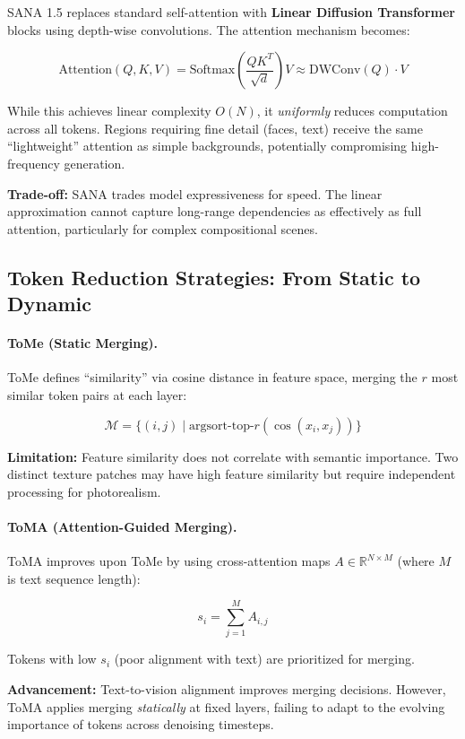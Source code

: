 \documentclass{article}
\begin{document}
SANA 1.5 \cite{xie2025sana} replaces standard self-attention with
\textbf{Linear Diffusion Transformer} blocks using depth-wise convolutions.
The attention mechanism becomes:

$$\text{Attention}(Q, K, V) = \text{Softmax}\left(\frac{QK^T}{\sqrt{d}}\right)V
    \approx \text{DWConv}(Q) \cdot V$$

While this achieves linear complexity $O(N)$, it \textit{uniformly} reduces
computation across all tokens. Regions requiring fine detail (faces, text)
receive the same ``lightweight'' attention as simple backgrounds, potentially
compromising high-frequency generation.

\textbf{Trade-off:} SANA trades model expressiveness for speed. The linear
approximation cannot capture long-range dependencies as effectively as full
attention, particularly for complex compositional scenes.

\subsection{Token Reduction Strategies: From Static to Dynamic}

\paragraph{ToMe (Static Merging).}
ToMe \cite{bolya2023token} defines ``similarity'' via cosine distance in feature
space, merging the $r$ most similar token pairs at each layer:

$$
    \mathcal{M} = \{(i, j) \mid \text{argsort-top-}r(\cos(x_i, x_j))\}
$$

\textbf{Limitation:} Feature similarity does not correlate with semantic
importance. Two distinct texture patches may have high feature similarity
but require independent processing for photorealism.

\paragraph{ToMA (Attention-Guided Merging).}
ToMA \cite{lu2025toma} improves upon ToMe by using cross-attention maps
$A \in \mathbb{R}^{N \times M}$ (where $M$ is text sequence length):

$$
    s_i = \sum_{j=1}^{M} A_{i,j}
$$

Tokens with low $s_i$ (poor alignment with text) are prioritized for merging.

\textbf{Advancement:} Text-to-vision alignment improves merging decisions.
However, ToMA applies merging \textit{statically} at fixed layers, failing
to adapt to the evolving importance of tokens across denoising timesteps.
\end{document}
